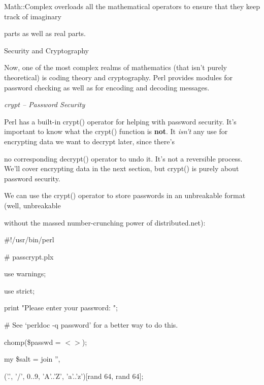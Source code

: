 \documentclass[a4paper,11pt]{book}
\begin{document}
\noindent Math::Complex overloads all the mathematical operators to ensure that they keep track of imaginary

\noindent parts as well as real parts.

\noindent 

\noindent Security and Cryptography

\noindent 

\noindent Now,  one of the  most  complex  realms  of  mathematics  (that  isn't  purely  theoretical)  is  coding theory and cryptography.  Perl  provides  modules  for  password  checking  as  well  as  for encoding and  decoding messages.

\noindent 

\noindent \textit{crypt -- Password Security}

\noindent Perl has a built-in crypt() operator for helping with password security. It's important to know what the crypt() function is \textbf{not}. It \textit{isn't }any use for encrypting data we want to decrypt later, since there's

\noindent no corresponding decrypt() operator to undo it. It's not a reversible process. We'll cover encrypting data in the next section, but crypt() is purely about password security.

\noindent 

\noindent 

\noindent We can use the crypt() operator to store passwords in an unbreakable format (well, unbreakable

\noindent without the massed number-crunching power of distributed.net):

\noindent 

\noindent 

\noindent \#!/usr/bin/perl

\noindent \# passcrypt.plx

\noindent use warnings;

\noindent use strict;

\noindent 

\noindent print "Please enter your password: ";

\noindent \# See `perldoc -q password' for a better way to do this.

\noindent chomp(\$passwd = $<$$>$);

\noindent 

\noindent my \$salt = join '',

\noindent ('.', '/', 0..9, 'A'..'Z', 'a'..'z')[rand 64, rand 64];
\end{document}
